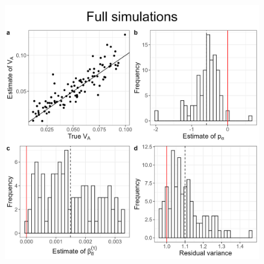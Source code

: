 \documentclass[12pt]{article}
\providecommand{\DIFaddbeginFL}{} %
\providecommand{\DIFdelbeginFL}{} %
\providecommand{\DIFdelendFL}{} %
\newcommand{\DIFscaledelfig}{0.5}
\newlength{\DIFdelgraphicswidth} %
\newlength{\DIFdelgraphicsheight} %
\newcommand{\DIFaddincludegraphics}[2][]{{\color{blue}\fbox{\DIFOincludegraphics[#1]{#2}}}} %
\newcommand{\DIFdelincludegraphics}[2][]{%
\sbox{\DIFdelgraphicsbox}{\DIFOincludegraphics[#1]{#2}}%
\settoboxwidth{\DIFdelgraphicswidth}{\DIFdelgraphicsbox} %
\settoboxtotalheight{\DIFdelgraphicsheight}{\DIFdelgraphicsbox} %
\scalebox{\DIFscaledelfig}{%
\parbox[b]{\DIFdelgraphicswidth}{\usebox{\DIFdelgraphicsbox}\\[-\baselineskip] \rule{\DIFdelgraphicswidth}{0em}}\llap{\resizebox{\DIFdelgraphicswidth}{\DIFdelgraphicsheight}{%
\setlength{\unitlength}{\DIFdelgraphicswidth}%
\begin{picture}(1,1)%
\thicklines\linethickness{2pt} %
{\color[rgb]{1,0,0}\put(0,0){\framebox(1,1){}}}%
{\color[rgb]{1,0,0}\put(0,0){\line( 1,1){1}}}%
{\color[rgb]{1,0,0}\put(0,1){\line(1,-1){1}}}%
\end{picture}%
}\hspace*{3pt}}} %
} %
\DeclareRobustCommand{\DIFaddbeginFL}{\DIFOaddbeginFL \let\includegraphics\DIFaddincludegraphics} %
\DeclareRobustCommand{\DIFdelbeginFL}{\DIFOdelbeginFL \let\includegraphics\DIFdelincludegraphics} %
\DeclareRobustCommand{\DIFdelendFL}{\DIFOaddendFL \let\includegraphics\DIFOincludegraphics} %
\begin{document}
\begin{bibunit}
\begin{figure}[H]
\DIFdelbeginFL %
\DIFdelendFL \DIFaddbeginFL \includegraphics[scale = 0.15]{Figures/full_main.jpg}

\end{figure}
\end{bibunit}
\end{document}
